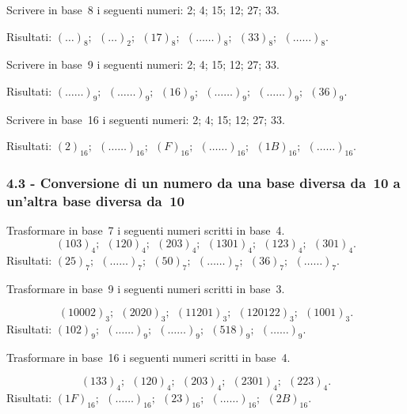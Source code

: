 \begin{esercizio}
\label{ese:4.12}
Scrivere in base~8 i seguenti numeri: 2; 4; 15; 12; 27; 33.

Risultati:
$(\ldots)_{8};\:\:(\ldots)_{2};\:\:(17)_{8};\:\:(\ldots\ldots)_{8};\:\:(33)_{8};\:\:(\ldots\ldots)_{8}$.
\end{esercizio}

\begin{esercizio}
\label{ese:4.13}
Scrivere in base~9 i seguenti numeri: 2; 4; 15; 12; 27; 33.

Risultati:
$(\ldots\ldots)_{9};\:\:(\ldots\ldots)_{9};\:\:(16)_{9};\:\:(\ldots\ldots)_{9};\:\:(\ldots\ldots)_{9};\:\:(36)_{9}$.

\end{esercizio}

\begin{esercizio}
\label{ese:4.14}
Scrivere in base~16 i seguenti numeri: 2; 4; 15; 12; 27; 33.

Risultati:
$(2)_{16};\:\:(\ldots\ldots)_{16};\:\:(F)_{16};\:\:(\ldots\ldots)_{16};\:\:(1B)_{16};\:\:(\ldots\ldots)_{16}$.
\end{esercizio}

\subsubsection*{4.3 - Conversione di un numero da una base diversa da~10 a un'altra base diversa da~10}

\begin{esercizio}
\label{ese:4.15}
Trasformare in base~7 i seguenti numeri scritti in base~4.
\[(103)_{4};\:\:(120)_{4};\:\:(203)_{4};\:\:(1301)_{4};\:\:(123)_{4};\:\:(301)_{4}.\]
Risultati:
$(25)_{7};\:\:(\ldots\ldots)_{7};\:\:(50)_{7};\:\:(\ldots\ldots)_{7};\:\:(36)_{7};\:\:(\ldots\ldots)_{7}$.
\end{esercizio}

\begin{esercizio}
\label{ese:4.16}
Trasformare in base~9 i seguenti numeri scritti in base~3.

\[(10002)_{3};\:\:(2020)_{3};\:\:(11201)_{3};\:\:(120122)_{3};\:\:(1001)_{3}.\]
Risultati:
$(102)_{9};\:\:(\ldots\ldots)_{9};\:\:(\ldots\ldots)_{9};\:\:(518)_{9};\:\:(\ldots\ldots)_{9}$.
\end{esercizio}

\begin{esercizio}
\label{ese:4.17}
Trasformare in base~16 i seguenti numeri scritti in base~4.

\[(133)_{4};\:\:(120)_{4};\:\:(203)_{4};\:\:(2301)_{4};\:\:(223)_{4}.\]
Risultati:
$(1F)_{16};\:\:(\ldots\ldots)_{16};\:\:(23)_{16};\:\:(\ldots\ldots)_{16};\:\:(2B)_{16}$.
\end{esercizio}

